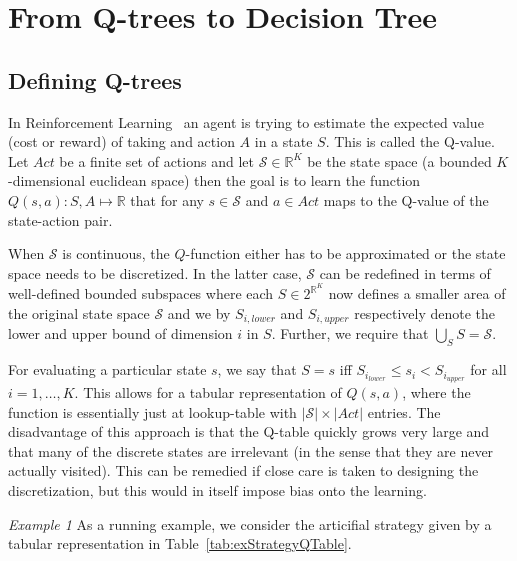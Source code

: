 \section{From Q-trees to Decision Tree}%
\label{sec:convergeToDT}

\subsection{Defining Q-trees}%
\label{subsec:defQTrees}

In Reinforcement Learning~\cite{Sutton1998} an agent is trying to estimate the
expected value (cost or reward) of taking and action $A$ in a state $S$. This is
called the Q-value. Let $Act$ be a finite set of actions and let $\mathcal{S}
\in \mathbb{R}^K$ be the state space (a bounded $K$-dimensional euclidean space)
then the goal is to learn the function $Q(s,a) : S, A \mapsto \mathbb{R}$ that
for any $s \in \mathcal{S}$ and $a \in Act$ maps to the Q-value of the
state-action pair.

When $\mathcal{S}$ is continuous, the $Q$-function either has to be approximated
or the state space needs to be discretized. In the latter case, $\mathcal{S}$
can be redefined in terms of well-defined bounded subspaces where each $S \in
2^{\mathbb{R}^{K}}$ now defines a smaller area of the original state space
$\mathcal{S}$ and we by $S_{i,lower}$ and $S_{i,upper}$ respectively denote the lower and
upper bound of dimension $i$ in $S$. Further, we require that $\bigcup_S S =
\mathcal{S}$.

For evaluating a particular state $s$, we say that $S = s$ iff $S_{i_{lower}}
\le s_i < S_{i_{upper}}$ for all $i = 1, \ldots, K$.  This allows for a tabular
representation of $Q(s,a)$, where the function is essentially just at
lookup-table with $|\mathcal{S}| \times |Act|$ entries. The disadvantage
of this approach is that the Q-table quickly grows very large and that many of
the discrete states are irrelevant (in the sense that they are never actually
visited). This can be remedied if close care is taken to designing the
discretization, but this would in itself impose bias onto the learning.

\textit{Example 1} As a running example, we consider the articifial strategy
given by a tabular representation in Table~\ref{tab:exStrategyQTable}. 

